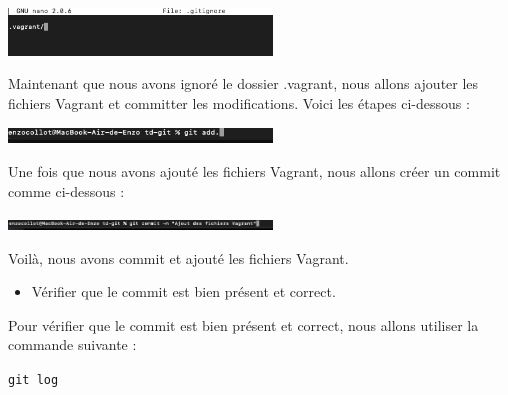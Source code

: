 \documentclass[12pt]{article}
\begin{document}
\vspace{0.3cm}

\begin{center}
  \includegraphics[width=7cm]{Images-TD-Git/Image-TD-Git-1/gitignore.png}
\end{center}

\vspace{0.3cm}

Maintenant que nous avons ignoré le dossier .vagrant, nous allons ajouter les fichiers Vagrant et committer les modifications. Voici les étapes ci-dessous :

\vspace{0.3cm}

\begin{center}
  \includegraphics[width=7cm]{Images-TD-Git/Image-TD-Git-1/git add.png}
\end{center}

Une fois que nous avons ajouté les fichiers Vagrant, nous allons créer un commit comme ci-dessous :

\vspace{0.3cm}

\begin{center}
  \includegraphics[width=7cm]{Images-TD-Git/Image-TD-Git-1/git commit.png}
\end{center}

\vspace{0.3cm}

Voilà, nous avons commit et ajouté les fichiers Vagrant.

\vspace{0.3cm}

\begin{itemize}
  \item Vérifier que le commit est bien présent et correct.
\end{itemize}

\vspace{0.3cm}

Pour vérifier que le commit est bien présent et correct, nous allons utiliser la commande suivante :

\texttt{git log}
\end{document}
